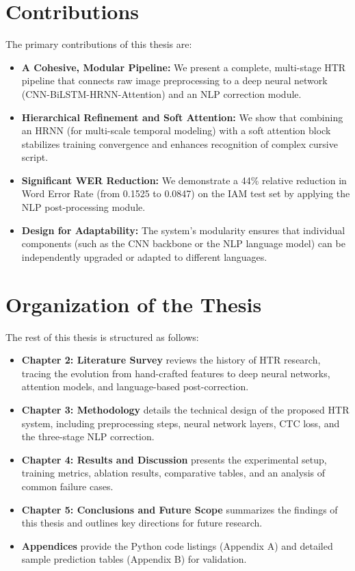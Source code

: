 \section{Contributions}
The primary contributions of this thesis are:
\begin{itemize}
    \item \textbf{A Cohesive, Modular Pipeline:} We present a complete, multi-stage HTR pipeline that connects raw image preprocessing to a deep neural network (CNN-BiLSTM-HRNN-Attention) and an NLP correction module.
    \item \textbf{Hierarchical Refinement and Soft Attention:} We show that combining an HRNN (for multi-scale temporal modeling) with a soft attention block stabilizes training convergence and enhances recognition of complex cursive script.
    \item \textbf{Significant WER Reduction:} We demonstrate a 44\% relative reduction in Word Error Rate (from 0.1525 to 0.0847) on the IAM test set by applying the NLP post-processing module.
    \item \textbf{Design for Adaptability:} The system's modularity ensures that individual components (such as the CNN backbone or the NLP language model) can be independently upgraded or adapted to different languages.
\end{itemize}

\section{Organization of the Thesis}
The rest of this thesis is structured as follows:
\begin{itemize}
    \item \textbf{Chapter 2: Literature Survey} reviews the history of HTR research, tracing the evolution from hand-crafted features to deep neural networks, attention models, and language-based post-correction.
    \item \textbf{Chapter 3: Methodology} details the technical design of the proposed HTR system, including preprocessing steps, neural network layers, CTC loss, and the three-stage NLP correction.
    \item \textbf{Chapter 4: Results and Discussion} presents the experimental setup, training metrics, ablation results, comparative tables, and an analysis of common failure cases.
    \item \textbf{Chapter 5: Conclusions and Future Scope} summarizes the findings of this thesis and outlines key directions for future research.
    \item \textbf{Appendices} provide the Python code listings (Appendix A) and detailed sample prediction tables (Appendix B) for validation.
\end{itemize}
